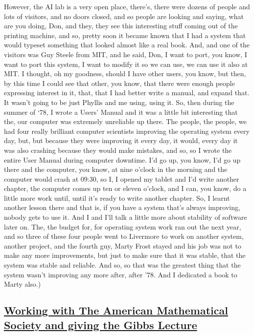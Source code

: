 \documentclass[]{article}
\begin{document}
However, the AI lab is a very open place, there's, there were dozens of
people and lots of visitors, and no doors closed, and so people are
looking and saying, what are you doing, Don, and they, they see this
interesting stuff coming out of the printing machine, and so, pretty
soon it became known that I had a system that would typeset something
that looked almost like a real book. And, and one of the visitors was
Guy Steele from MIT, and he said, Don, I want to port, you know, I want
to port this system, I want to modify it so we can use, we can use it
also at MIT. I thought, oh my goodness, should I have other users, you
know, but then, by this time I could see that other, you know, that
there were enough people expressing interest in it, that, that I had
better write a manual, and expand that. It wasn't going to be just
Phyllis and me using, using it. So, then during the summer of `78, I
wrote a Users' Manual and it was a little bit interesting that the, our
computer was extremely unreliable up there. The people, the people, we
had four really brilliant computer scientists improving the operating
system every day, but, but because they were improving it every day, it
would, every day it was also crashing because they would make mistakes,
and so, so I wrote the entire User Manual during computer downtime. I'd
go up, you know, I'd go up there and the computer, you know, at nine
o'clock in the morning and the computer would crash at 09:30, so I, I
opened my tablet and I'd write another chapter, the computer comes up
ten or eleven o'clock, and I can, you know, do a little more work until,
until it's ready to write another chapter. So, I learnt another lesson
there and that is, if you have a system that's always improving, nobody
gets to use it. And I and I'll talk a little more about stability of
software later on. The, the budget for, for operating system work ran
out the next year, and so three of these four people went to Livermore
to work on another system, another project, and the fourth guy, Marty
Frost stayed and his job was not to make any more improvements, but just
to make sure that it was stable, that the system was stable and
reliable. And so, so that was the greatest thing that the system wasn't
improving any more after, after '78. And I dedicated a book to Marty
also.)

\subsection{\texorpdfstring{\href{http://webofstories.com/play/17120}{Working
with The American Mathematical Society and giving the Gibbs
Lecture}}{Working with The American Mathematical Society and giving the Gibbs Lecture}}\label{working-with-the-american-mathematical-society-and-giving-the-gibbs-lecture}
\end{document}
